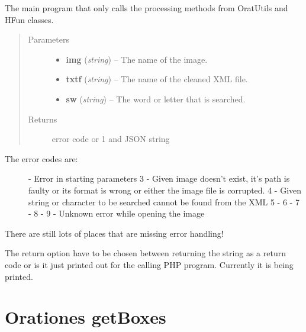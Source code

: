 \documentclass[letterpaper,10pt,english]{sphinxmanual}
\begin{document}
\begin{fulllineitems}
\label{code:osearch.osearch}
The main program that only calls the processing methods from OratUtils and HFun classes.
\begin{quote}\begin{description}
\item[{Parameters}] \leavevmode\begin{itemize}
\item {} 
\textbf{img} (\emph{string}) -- The name of the image.

\item {} 
\textbf{txtf} (\emph{string}) -- The name of the cleaned XML file.

\item {} 
\textbf{sw} (\emph{string}) -- The word or letter that is searched.

\end{itemize}

\item[{Returns}] \leavevmode
error code or 1 and JSON string

\end{description}\end{quote}
\begin{description}
\item[{The error codes are:}]  - Error in starting parameters
3 - Given image doesn't exist, it's path is faulty or its format is wrong or either the image file is corrupted.
4 - Given string or character to be searched cannot be found from the XML
5 - 
6 - 
7 - 
8 - 
9 - Unknown error while opening the image

\end{description}

There are still lots of places that are missing error handling!

The return option have to be chosen between returning the string as a return code or 
is it just printed out for the calling PHP program. Currently it is being printed.

\end{fulllineitems}



\section{Orationes getBoxes}
\label{code:orationes-getboxes}\label{code:module-getBoxes}
\end{document}
